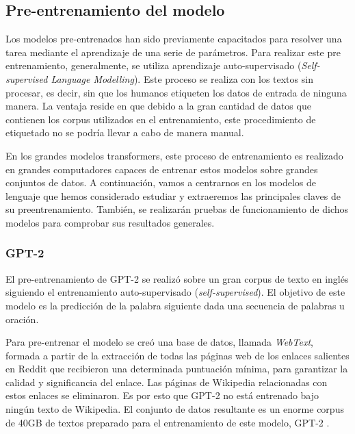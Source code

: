 


\subsection{Pre-entrenamiento del modelo}

Los modelos pre-entrenados han sido previamente capacitados para resolver una tarea mediante el aprendizaje de una serie de parámetros. Para realizar este pre entrenamiento, generalmente, se utiliza aprendizaje auto-supervisado (\textit{Self-supervised Language Modelling}). Este proceso se realiza con los textos sin procesar, es decir, sin que los humanos etiqueten los datos de entrada de ninguna manera. La ventaja reside en que debido a la gran cantidad de datos que contienen los corpus utilizados en el entrenamiento, este procedimiento de etiquetado no se podría llevar a cabo de manera manual. %


En los grandes modelos transformers, este proceso de entrenamiento es realizado en grandes computadores capaces de entrenar estos modelos sobre grandes conjuntos de datos. A continuación, vamos a centrarnos en los modelos de lenguaje que hemos considerado estudiar y extraeremos las principales claves de su preentrenamiento. También, se realizarán pruebas de funcionamiento de dichos modelos para comprobar sus resultados generales.



\subsubsection{GPT-2}

El pre-entrenamiento de GPT-2 se realizó sobre un gran corpus de texto en inglés siguiendo el entrenamiento auto-supervisado (\textit{self-supervised}). El objetivo de este modelo es la predicción de la palabra siguiente dada una secuencia de palabras u oración.

Para pre-entrenar el modelo se creó una base de datos, llamada \textit{WebText}, formada a partir de la extracción de todas las páginas web de los enlaces salientes en Reddit que recibieron una determinada puntuación mínima, para garantizar la calidad y significancia del enlace. Las páginas de Wikipedia relacionadas con estos enlaces se eliminaron. Es por esto que GPT-2 no está entrenado bajo ningún texto de Wikipedia. El conjunto de datos resultante es un enorme corpus de 40GB de textos preparado para el entrenamiento de este modelo, GPT-2 \citep{radford2019language}.

